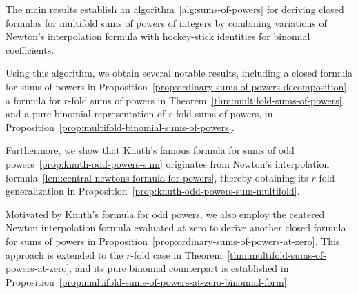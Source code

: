 The main results establish an algorithm~\eqref{alg:sums-of-powers}
for deriving closed formulas for multifold sums of powers of integers
by combining variations of Newton's interpolation formula with
hockey-stick identities for binomial coefficients.

Using this algorithm, we obtain several notable results, including
a closed formula for sums of powers
in Proposition~\eqref{prop:ordinary-sums-of-powers-decomposition},
a formula for $r$-fold sums of powers in
Theorem~\eqref{thm:multifold-sums-of-powers},
and a pure binomial representation of $r$-fold sums of powers,
in Proposition~\eqref{prop:multifold-binomial-sums-of-powers}.

Furthermore, we show that Knuth's famous formula for sums
of odd powers~\eqref{prop:knuth-odd-powers-sum}
originates from Newton's interpolation
formula~\eqref{lem:central-newtons-formula-for-powers},
thereby obtaining its $r$-fold generalization
in Proposition~\eqref{prop:knuth-odd-powers-sum-multifold}.

Motivated by Knuth's formula for odd powers, we also employ
the centered Newton interpolation formula evaluated at zero
to derive another closed formula for sums of
powers in Proposition~\eqref{prop:ordinary-sums-of-powers-at-zero}.
This approach is extended to the $r$-fold case in
Theorem~\eqref{thm:multifold-sums-of-powers-at-zero},
and its pure binomial counterpart is established in
Proposition~\eqref{prop:multifold-sums-of-powers-at-zero-binomial-form}.
